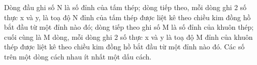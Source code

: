 Dòng đầu ghi số N là số đỉnh của tấm thép; dòng tiếp theo, mỗi dòng ghi 2 số thực x và y, là toạ độ N đỉnh của tấm thép được liệt kê theo chiều   kim đồng hồ bắt đầu từ một đỉnh nào đó; dòng tiếp theo ghi số M là số đỉnh của khuôn thép; cuối cùng là M dòng, mỗi dòng ghi 2 số thực x và y là toạ   độ M đỉnh của khuôn thép được liệt kê theo chiều kim đồng hồ bắt đầu từ một đỉnh nào đó. Các số trên một dòng cách nhau ít nhất một dấu cách.